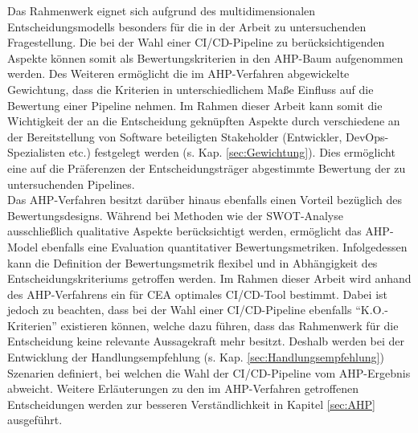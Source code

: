 Das Rahmenwerk eignet sich aufgrund des multidimensionalen Entscheidungsmodells besonders für die in der Arbeit zu untersuchenden Fragestellung. Die bei der Wahl einer CI/CD-Pipeline zu berücksichtigenden Aspekte können somit als Bewertungskriterien in den AHP-Baum aufgenommen werden. Des Weiteren ermöglicht die im AHP-Verfahren abgewickelte Gewichtung, dass die Kriterien in unterschiedlichem Maße Einfluss auf die Bewertung einer Pipeline nehmen. Im Rahmen dieser Arbeit kann somit die Wichtigkeit der an die Entscheidung geknüpften Aspekte durch verschiedene an der Bereitstellung von Software beteiligten Stakeholder (Entwickler, DevOps-Spezialisten etc.) festgelegt werden (s. Kap. \ref{sec:Gewichtung}). Dies ermöglicht eine auf die Präferenzen der Entscheidungsträger abgestimmte Bewertung der zu untersuchenden Pipelines.\\ Das AHP-Verfahren besitzt darüber hinaus ebenfalls einen Vorteil bezüglich des Bewertungsdesigns. Während bei Methoden wie der SWOT-Analyse ausschließlich qualitative Aspekte berücksichtigt werden, ermöglicht das AHP-Model ebenfalls eine Evaluation quantitativer Bewertungsmetriken. Infolgedessen kann die Definition der Bewertungsmetrik flexibel und in Abhängigkeit des Entscheidungskriteriums getroffen werden. Im Rahmen dieser Arbeit wird anhand des AHP-Verfahrens ein für CEA optimales CI/CD-Tool bestimmt. Dabei ist jedoch zu beachten, dass bei der Wahl einer CI/CD-Pipeline ebenfalls \enquote{K.O.-Kriterien} existieren können, welche dazu führen, dass das Rahmenwerk für die Entscheidung keine relevante Aussagekraft mehr besitzt. Deshalb werden bei der Entwicklung der Handlungsempfehlung (s. Kap. \ref{sec:Handlungsempfehlung}) Szenarien definiert, bei welchen die Wahl der CI/CD-Pipeline vom AHP-Ergebnis abweicht. Weitere Erläuterungen zu den im AHP-Verfahren getroffenen Entscheidungen werden zur besseren Verständlichkeit in Kapitel \ref{sec:AHP} ausgeführt. 